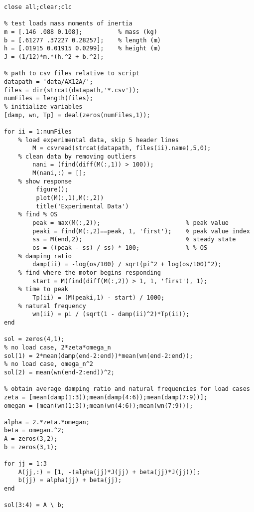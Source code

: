 \begin{lstlisting}[frame=lines,style=Matlab-editor,basicstyle = \mlttfamily, label=code:mmodel, caption=Actuator Dynamics MATLAB Code]
% dynamixel motor model experiment
close all;clear;clc

% test loads mass moments of inertia
m = [.146 .088 0.108];          % mass (kg)
b = [.61277 .37227 0.28257];    % length (m)
h = [.01915 0.01915 0.0299];    % height (m)
J = (1/12)*m.*(h.^2 + b.^2);

% path to csv files relative to script
datapath = 'data/AX12A/';
files = dir(strcat(datapath,'*.csv'));
numFiles = length(files);
% initialize variables
[damp, wn, Tp] = deal(zeros(numFiles,1));

for ii = 1:numFiles
    % load experimental data, skip 5 header lines
        M = csvread(strcat(datapath, files(ii).name),5,0);
    % clean data by removing outliers
        nani = (find(diff(M(:,1)) > 100));
        M(nani,:) = [];
    % show response
         figure();
         plot(M(:,1),M(:,2))
         title('Experimental Data')
    % find % OS
        peak = max(M(:,2));                        % peak value
        peaki = find(M(:,2)==peak, 1, 'first');    % peak value index
        ss = M(end,2);                             % steady state
        os = ((peak - ss) / ss) * 100;             % % OS
    % damping ratio
        damp(ii) = -log(os/100) / sqrt(pi^2 + log(os/100)^2);
    % find where the motor begins responding
        start = M(find(diff(M(:,2)) > 1, 1, 'first'), 1);
    % time to peak
        Tp(ii) = (M(peaki,1) - start) / 1000;
    % natural frequency
        wn(ii) = pi / (sqrt(1 - damp(ii)^2)*Tp(ii));
end

sol = zeros(4,1);
% no load case, 2*zeta*omega_n
sol(1) = 2*mean(damp(end-2:end))*mean(wn(end-2:end));
% no load case, omega_n^2
sol(2) = mean(wn(end-2:end))^2;

% obtain average damping ratio and natural frequencies for load cases
zeta = [mean(damp(1:3));mean(damp(4:6));mean(damp(7:9))];
omegan = [mean(wn(1:3));mean(wn(4:6));mean(wn(7:9))];

alpha = 2.*zeta.*omegan;
beta = omegan.^2;
A = zeros(3,2);
b = zeros(3,1);

for jj = 1:3
    A(jj,:) = [1, -(alpha(jj)*J(jj) + beta(jj)*J(jj))];
    b(jj) = alpha(jj) + beta(jj);
end

sol(3:4) = A \ b;
\end{lstlisting}
